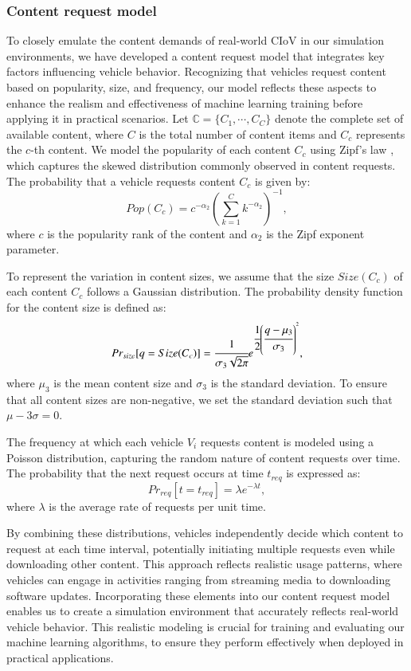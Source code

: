 \documentclass{aims}
\numberwithin{equation}{section}
\begin{document}
\subsubsection{Content request model}
To closely emulate the content demands of real-world CIoV in our simulation environments, we have developed a content request model that integrates key factors influencing vehicle behavior.
Recognizing that vehicles request content based on popularity, size, and frequency, our model reflects these aspects to enhance the realism and effectiveness of machine learning training before applying it in practical scenarios.
Let $\mathbb{C}=\{C_{1}, \cdots, C_{C}\}$ denote the complete set of available content, where $C$ is the total number of content items and $C_{c}$ represents the $c$-th content.
We model the popularity of each content $C_{c}$ using Zipf's law \cite{Zipf}, which captures the skewed distribution commonly observed in content requests.
The probability that a vehicle requests content $C_{c}$ is given by:
\begin{equation}
    Pop(C_{c})=c^{-\alpha_{2}}\left(\sum^{C}_{k=1}k^{-\alpha_{2}}\right)^{-1},
\end{equation}
where $c$ is the popularity rank of the content and $\alpha_{2}$ is the Zipf exponent parameter.

To represent the variation in content sizes, we assume that the size $Size(C_{c})$ of each content $C_{c}$ follows a Gaussian distribution.
The probability density function for the content size is defined as:
\begin{equation}
    Pr_{size}[q=Size(C_{c})]=\cfrac{1}{\sigma_{3}\sqrt{2\pi}}e^{\cfrac{1}{2}\left( \cfrac{q-\mu_{3}}{\sigma_{3}}\right)^{2}},
\end{equation}
where $\mu_{3}$ is the mean content size and $\sigma_{3}$ is the standard deviation.
To ensure that all content sizes are non-negative, we set the standard deviation such that $\mu-3\sigma = 0$.

The frequency at which each vehicle $V_{i}$ requests content is modeled using a Poisson distribution, capturing the random nature of content requests over time. The probability that the next request occurs at time $t_{req}$ is expressed as:
\begin{equation}
    Pr_{req}[t=t_{req}]=\lambda e^{-\lambda t},
\end{equation}
where $\lambda$ is the average rate of requests per unit time.

By combining these distributions, vehicles independently decide which content to request at each time interval, potentially initiating multiple requests even while downloading other content.
This approach reflects realistic usage patterns, where vehicles can engage in activities ranging from streaming media to downloading software updates.
Incorporating these elements into our content request model enables us to create a simulation environment that accurately reflects real-world vehicle behavior.
This realistic modeling is crucial for training and evaluating our machine learning algorithms, to ensure they perform effectively when deployed in practical applications.
\end{document}
